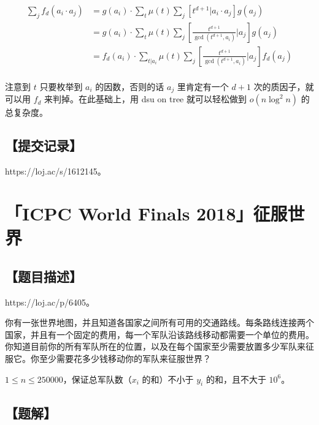 \documentclass[UTF8,12pt,a4paper]{ctexart}
\begin{document}
	$$
	\begin{aligned}
		\sum_{j} f_d(a_i\cdot a_j)
		&= g(a_i)\cdot \sum_t \mu(t)\sum_{j} \left[t^{d+1}|a_i\cdot a_j\right]g(a_j)\\
		&= g(a_i)\cdot \sum_t \mu(t) \sum_{j} \left[\frac{t^{d+1}}{\gcd(t^{d+1},a_i)}|a_j\right]g(a_j)\\
		&= f_d(a_i)\cdot \sum_{t|a_i} \mu(t) \sum_{j} \left[\frac{t^{d+1}}{\gcd(t^{d+1},a_i)}|a_j\right]f_d(a_j)\\
	\end{aligned}
	$$
	
	注意到 $t$ 只要枚举到 $a_i$ 的因数，否则的话 $a_j$ 里肯定有一个 $d+1$ 次的质因子，就可以用 $f_d$ 来判掉。在此基础上，用 dsu on tree 就可以轻松做到 $o(n\log^2n)$ 的总复杂度。
	
	\subsection*{【提交记录】}
	
	https://loj.ac/s/1612145。
	
	
	\section*{「ICPC World Finals 2018」征服世界}
	
	\subsection*{【题目描述】}
	
	https://loj.ac/p/6405。
	
	你有一张世界地图，并且知道各国家之间所有可用的交通路线。每条路线连接两个国家，并且有一个固定的费用，每一个军队沿该路线移动都需要一个单位的费用。你知道目前你的所有军队所在的位置，以及在每个国家至少需要放置多少军队来征服它。你至少需要花多少钱移动你的军队来征服世界？
	
	$1 \le n \le 250000$，保证总军队数（$x_i$ 的和）不小于 $y_i$ 的和，且不大于 $10^6$。
	
	\subsection*{【题解】}
	
\end{document}
